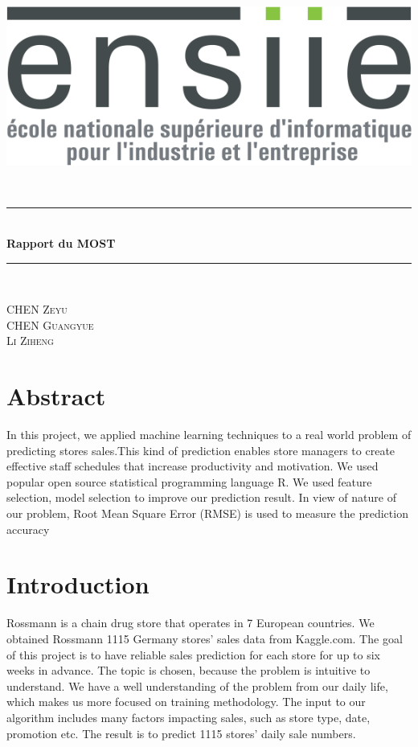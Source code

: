 \documentclass[12pt]{article}
\newcommand{\HRule}{\rule{\linewidth}{0.5mm}}
\begin{document}
\includegraphics[scale=0.25]{image/ensiie.jpeg}
\begin{center}
        
				\\[1.5cm]
				\HRule \\[0.4cm]
				{ \huge \bfseries Rapport du MOST \\[0.4cm] }
				\HRule \\[3cm]

			
				\begin{center} \large
					CHEN \textsc{Zeyu}\\
					\textsc{CHEN Guangyue}\\
					\textsc{Li Ziheng}\\
				\end{center}
				\vfill
				
\end{center}

\newpage 
\renewcommand{\contentsname}{Sommaire}
    
\tableofcontents 
\newpage
\section {Abstract}
\begin{addmargin}[2em]{0em} 
    In this project, we applied machine learning techniques to a real world problem of predicting stores sales.This kind of prediction enables store managers to create effective staff schedules that increase productivity
and motivation. We used popular open source statistical programming language R. We used feature selection, model selection to improve our prediction result. In view of nature of our problem, Root Mean Square Error (RMSE) is used to measure the prediction accuracy
    \end{addmargin}

\section {Introduction}
Rossmann is a chain drug store that operates in 7 European countries. We obtained Rossmann 1115 Germany stores’ sales data from Kaggle.com. The goal of this project is to have reliable sales prediction for each store for up to six weeks in advance. The topic is chosen, because the problem is intuitive to understand. We have a well understanding of the problem from our daily life, which makes us more focused on training methodology.
The input to our algorithm includes many factors impacting sales, such as store type, date, promotion etc. The result is to predict 1115 stores’ daily sale numbers. 
\newpage
\end{document}
